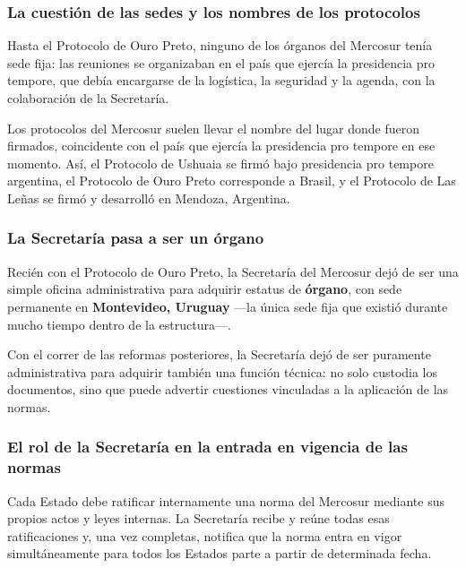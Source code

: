 \documentclass[12pt,oneside]{book}
\begin{document}
\subsubsection{La cuestión de las sedes y los nombres de los protocolos}

Hasta el Protocolo de Ouro Preto, ninguno de los órganos del Mercosur tenía sede fija: las reuniones se organizaban en el país que ejercía la presidencia pro tempore, que debía encargarse de la logística, la seguridad y la agenda, con la colaboración de la Secretaría.

\begin{note}
Los protocolos del Mercosur suelen llevar el nombre del lugar donde fueron firmados, coincidente con el país que ejercía la presidencia pro tempore en ese momento. Así, el Protocolo de Ushuaia se firmó bajo presidencia pro tempore argentina, el Protocolo de Ouro Preto corresponde a Brasil, y el Protocolo de Las Leñas se firmó y desarrolló en Mendoza, Argentina.
\end{note}

\subsubsection{La Secretaría pasa a ser un órgano}

Recién con el Protocolo de Ouro Preto, la Secretaría del Mercosur dejó de ser una simple oficina administrativa para adquirir estatus de \textbf{órgano}, con sede permanente en \textbf{Montevideo, Uruguay} —la única sede fija que existió durante mucho tiempo dentro de la estructura—.

Con el correr de las reformas posteriores, la Secretaría dejó de ser puramente administrativa para adquirir también una función técnica: no solo custodia los documentos, sino que puede advertir cuestiones vinculadas a la aplicación de las normas.

\subsubsection{El rol de la Secretaría en la entrada en vigencia de las normas}

Cada Estado debe ratificar internamente una norma del Mercosur mediante sus propios actos y leyes internas. La Secretaría recibe y reúne todas esas ratificaciones y, una vez completas, notifica que la norma entra en vigor simultáneamente para todos los Estados parte a partir de determinada fecha.
\end{document}
